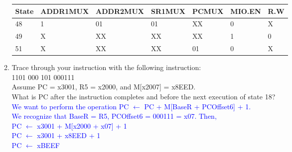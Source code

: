 \documentclass{article}
\begin{document}
\begin{enumerate}[label=(\alph*)]
\begin{enumerate}[label=(\alph*),itemsep = 20pt]
\begin{table}[!h]
\begin{tabular}{|l|l|l|l|l|l|l|}
\hline
\textbf{State} & \textbf{ADDR1MUX} & \textbf{ADDR2MUX} & \textbf{SR1MUX} & \textbf{PCMUX} & \textbf{MIO.EN} & \textbf{R.W} \\ \hline
48             & 1                 & 01                & 01              & XX             & 0               & X            \\ \hline
49             & X                 & XX                & XX              & XX             & 1               & 0            \\ \hline
51             & X                 & XX                & XX              & 01             & 0               & X            \\ \hline
\end{tabular}
\end{table}
        
        \item Trace through your instruction with the following instruction: \\
        1101 000 101 000111 \\
        Assume PC = x3001, R5 = x2000, and M[x2007] = x8EED. \\
        What is PC after the instruction completes and before the next execution of state 18?\\
        \textcolor{blue}{
        We want to perform the operation PC $\longleftarrow$ PC + M[BaseR + PCOffset6] + 1. \\ We recognize that BaseR = R5, PCOffset6 = 000111 = x07. Then, \\
        PC $\longleftarrow$ x3001 + M[x2000 + x07] + 1 \\
        PC $\longleftarrow$ x3001 + x8EED + 1 \\
        PC $\longleftarrow$ xBEEF \\
        }
        
    \end{enumerate}

    \newpage

\end{enumerate}
\end{document}
